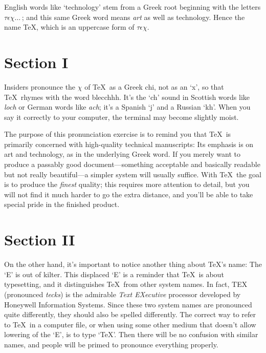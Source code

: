 \begin{review}

English words like `technology' stem from a Greek root beginning with
the letters $\tau\epsilon\chi\ldots\,$; and this same Greek word means {\sl
art\/} as well as technology. Hence the name \TeX, which is an
uppercase form of $\tau\epsilon\chi$. 

\section*{Section I}

Insiders pronounce the $\chi$ of \TeX\ as a Greek chi, not as an `x', so that
\TeX\ rhymes with the word blecchhh. It's the `ch' sound in Scottish words
like {\sl loch\/} or German words like {\sl ach\/}; it's a Spanish `j' and a
Russian `kh'. When you say it correctly to your computer, the terminal
may become slightly moist.

The purpose of this pronunciation exercise is to remind you that \TeX\ is
primarily concerned with high-quality technical manuscripts: Its emphasis is
on art and technology, as in the underlying Greek word. If you merely want
to produce a passably good document---something acceptable and basically
readable but not really beautiful---a simpler system will usually suffice.
With \TeX\ the goal is to produce the {\sl finest\/} quality; this requires
more attention to detail, but you will not find it much harder to go the
extra distance, and you'll be able to take special pride in the finished
product. 

\section*{Section II}

On the other hand, it's important to notice another thing about \TeX's name:
The `E' is out of kilter. This 
displaced `E' is a reminder that \TeX\ is about typesetting, and it
distinguishes \TeX\ from other system names. In fact, TEX (pronounced
{\sl tecks\/}) is the admirable {\sl Text EXecutive\/} processor developed by
Honeywell Information Systems. Since these two system names are
pronounced quite differently, they should also be spelled differently. The
correct way to refer to \TeX\ in a computer file, or when using some other
medium that doesn't allow lowering of the `E', is to type `TeX'. Then
there will be no confusion with similar names, and people will be
primed to pronounce everything properly.


\end{review}
